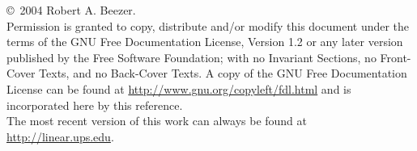 %
%
\noindent
\copyright\ 2004  Robert A. Beezer.\\[12pt]
Permission is granted to copy, distribute and/or modify this document under the terms of the GNU Free Documentation License, Version 1.2 or any later version published by the Free Software Foundation; with no Invariant Sections, no Front-Cover Texts, and no Back-Cover Texts.  A copy of the GNU Free Documentation License can be found at \url{http://www.gnu.org/copyleft/fdl.html} and is incorporated here by this reference.\\[12pt]
The most recent version of this work can always be found at \url{http://linear.ups.edu}.\\[24pt]


